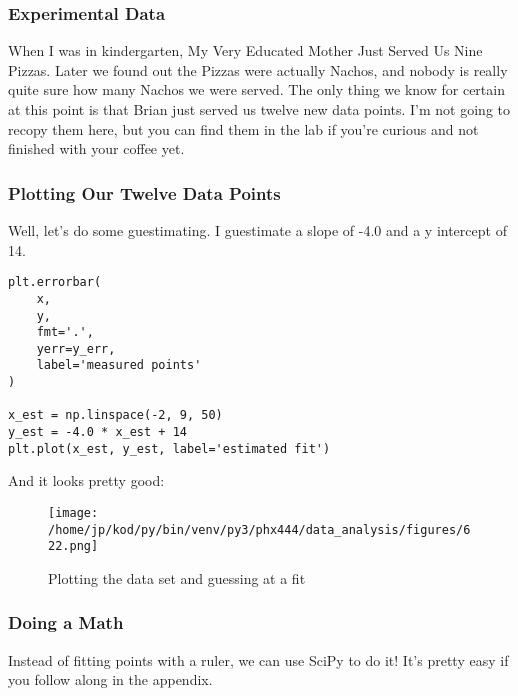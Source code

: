 \documentclass{article}
\begin{document}
\subsubsection{Experimental Data}
When I was in kindergarten, My Very Educated Mother Just Served Us Nine Pizzas.
Later we found out the Pizzas were actually Nachos, and nobody is really quite
sure how many Nachos we were served. The only thing we know for certain at this
point is that Brian just served us twelve new data points. I'm not going to
recopy them here, but you can find them in the lab if you're curious and not
finished with your coffee yet.

\subsubsection{Plotting Our Twelve Data Points}
Well, let's do some guestimating. I guestimate a slope of -4.0 and a y
intercept of 14.
\begin{center}
\begin{minipage}[t]{.80\textwidth}
\begin{lstlisting}[frame=tlrb]
plt.errorbar(
    x,
    y,
    fmt='.',
    yerr=y_err,
    label='measured points'
)

x_est = np.linspace(-2, 9, 50)
y_est = -4.0 * x_est + 14
plt.plot(x_est, y_est, label='estimated fit')
\end{lstlisting}
\end{minipage}
\end{center}

And it looks pretty good:
\begin{figure}[H]
        \begin{center}
        \texttt{[image: /home/jp/kod/py/bin/venv/py3/phx444/data\_analysis/figures/622.png]}
        \caption{Plotting the data set and guessing at a fit}
        \label{fig:fig_17}
        \end{center}
\end{figure}

\subsubsection{Doing a Math}
Instead of fitting points with a ruler, we can use SciPy to do it! It's pretty
easy if you follow along in the appendix.
\end{document}
